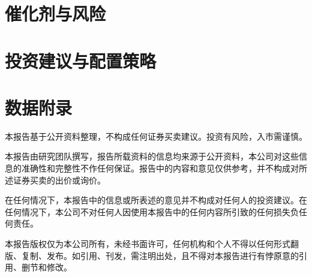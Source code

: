 \documentclass[a4paper,11pt,openany,fontset=none]{ctexrep}
\newcommand{\reportdisclaimer}{本报告基于公开资料整理，不构成任何证券买卖建议。投资有风险，入市需谨慎。}
\begin{document}
\chapter{催化剂与风险}


\chapter{投资建议与配置策略}


\appendix
\chapter{数据附录}


\clearpage
\thispagestyle{empty}
\vspace*{4cm}
\begin{disclosurebox}[免责声明]
\small
\reportdisclaimer\par
本报告由研究团队撰写，报告所载资料的信息均来源于公开资料，本公司对这些信息的准确性和完整性不作任何保证。报告中的内容和意见仅供参考，并不构成对所述证券买卖的出价或询价。\par
在任何情况下，本报告中的信息或所表述的意见并不构成对任何人的投资建议。在任何情况下，本公司不对任何人因使用本报告中的任何内容所引致的任何损失负任何责任。\par
本报告版权仅为本公司所有，未经书面许可，任何机构和个人不得以任何形式翻版、复制、发布。如引用、刊发，需注明出处，且不得对本报告进行有悖原意的引用、删节和修改。
\end{disclosurebox}
\end{document}
